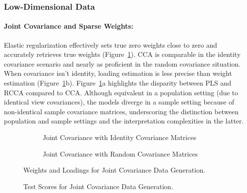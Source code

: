 \subsubsection{Low-Dimensional Data}

\paragraph{Joint Covariance and Sparse Weights:} Elastic regularization effectively sets true zero weights close to zero and accurately retrieves true weights (Figure~\ref{fig:joint-identity-weights-loadings}). CCA is comparable in the identity covariance scenario and nearly as proficient in the random covariance situation.
When covariance isn't identity, loading estimation is less precise than weight estimation (Figure~\ref{fig:joint-identity-weights-loadings}b).
Figure~\ref{fig:joint-identity-weights-loadings}a highlights the disparity between PLS and RCCA compared to CCA.
Although equivalent in a population setting (due to identical view covariances), the models diverge in a sample setting because of non-identical sample covariance matrices, underscoring the distinction between population and sample settings and the interpretation complexities in the latter.

\begin{figure}
\centering
\begin{subfigure}{0.49\linewidth}
\centering

\caption{Joint Covariance with Identity Covariance Matrices}
\end{subfigure}
%
\begin{subfigure}{0.49\linewidth}
\centering

\caption{Joint Covariance with Random Covariance Matrices}
\end{subfigure}
\caption{Weights and Loadings for Joint Covariance Data Generation.}
\label{fig:joint-identity-weights-loadings}
\end{figure}

\begin{figure}
\centering
\begin{subfigure}{0.49\linewidth}
\centering

\caption{}
\end{subfigure}
%
\begin{subfigure}{0.49\linewidth}
\centering

\caption{}
\end{subfigure}
\caption{Test Scores for Joint Covariance Data Generation.}
\label{fig:joint-scores}
\end{figure}

